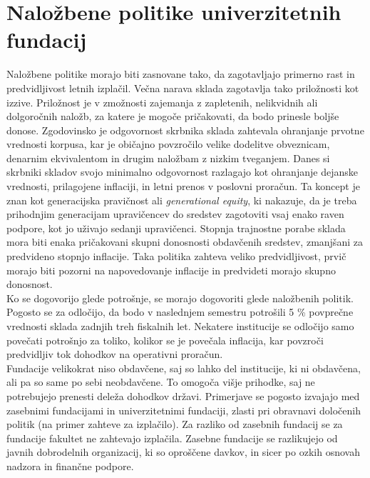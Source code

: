 \documentclass[12pt, a4paper]{article}
\begin{document}
\section[Naložbene politike univerzitetnih fundacij]{Naložbene politike univerzitetnih fundacij}

Naložbene politike morajo biti zasnovane tako, da zagotavljajo primerno rast in predvidljivost letnih izplačil. Večna narava sklada zagotavlja tako priložnosti kot izzive. Priložnost je v zmožnosti zajemanja z zapletenih, nelikvidnih ali dolgoročnih naložb, za katere je mogoče pričakovati, da bodo prinesle boljše donose. Zgodovinsko je odgovornost skrbnika sklada zahtevala ohranjanje prvotne vrednosti korpusa, kar je običajno povzročilo velike dodelitve obveznicam, denarnim ekvivalentom in drugim naložbam z nizkim tveganjem. Danes si skrbniki skladov svojo minimalno odgovornost razlagajo kot ohranjanje dejanske vrednosti, prilagojene inflaciji, in letni prenos v poslovni proračun. Ta koncept je znan kot generacijska pravičnost ali \textit{generational equity}, ki nakazuje, da je treba prihodnjim generacijam upravičencev do sredstev zagotoviti vsaj enako raven podpore, kot jo uživajo sedanji upravičenci. Stopnja trajnostne porabe sklada mora biti enaka pričakovani skupni donosnosti obdavčenih sredstev, zmanjšani za predvideno stopnjo inflacije. Taka politika zahteva veliko predvidljivost, prvič morajo biti pozorni na napovedovanje inflacije in predvideti morajo skupno donosnost. \\

Ko se dogovorijo glede potrošnje, se morajo dogovoriti glede naložbenih politik. Pogosto se za odločijo, da bodo v naslednjem semestru potrošili 5 \% povprečne vrednosti sklada zadnjih treh fiskalnih let. Nekatere institucije se odločijo samo povečati potrošnjo za toliko, kolikor se je povečala inflacija, kar povzroči predvidljiv tok dohodkov na operativni proračun. \cite{investment1}\\

Fundacije velikokrat niso obdavčene, saj so lahko del institucije, ki ni obdavčena, ali pa so same po sebi neobdavčene. To omogoča višje prihodke, saj ne potrebujejo prenesti deleža dohodkov državi. Primerjave se pogosto izvajajo med zasebnimi fundacijami in univerzitetnimi fundaciji, zlasti pri obravnavi določenih politik (na primer zahteve za izplačilo). Za razliko od zasebnih fundacij se za fundacije fakultet ne zahtevajo izplačila. Zasebne fundacije se razlikujejo od javnih dobrodelnih organizacij, ki so oproščene davkov, in sicer po ozkih osnovah nadzora in finančne podpore.\\
\end{document}
